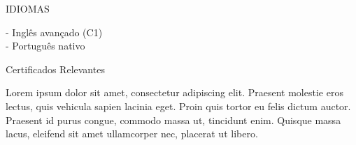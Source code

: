 \documentclass{resume} %
\begin{document}

\vspace{4em}

\begin{rSection}{IDIOMAS}

{- Inglês avançado (C1)}\\
{- Português nativo }\\

\end{rSection}


\begin{rSection}{Certificados Relevantes}

{Lorem ipsum dolor sit amet, consectetur adipiscing elit. Praesent molestie eros lectus, quis vehicula sapien lacinia eget. Proin quis tortor eu felis dictum auctor. Praesent id purus congue, commodo massa ut, tincidunt enim. Quisque massa lacus, eleifend sit amet ullamcorper nec, placerat ut libero.}\\

\end{rSection}

\end{document}
